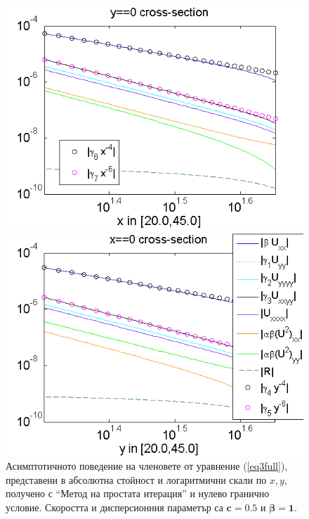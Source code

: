 \documentclass[a4paper]{article}
\newcommand{\rf}[1]{(\ref{#1})}
\theoremstyle{remark}
\begin{document}
\begin{figure}[ht]
	\begin{minipage}[b]{0.95\linewidth}
		\raggedleft
		\includegraphics[width=\linewidth]{AssymptForEachTerm/bt1_c010_090/ChristovIC_AlongX_50_ZB2_bt1_c050_h020_O(h^6).png}
	\end{minipage}
	\begin{minipage}[b]{0.95\linewidth}
		 \raggedright
		\includegraphics[width=\linewidth]{AssymptForEachTerm/bt1_c010_090/ChristovIC_AlongY_50_ZB2_bt1_c050_h020_O(h^6).png}
	\end{minipage}
	\caption{Асимптотичното поведение на членовете от уравнение \rf{eq3full}, представени в абсолютна стойност и логаритмични скали по $x,y$, получено с ``Метод на простата итерация'' и нулево гранично условие. Скоростта и дисперсионния параметър са $\boldsymbol{c=0.5}$ и $\boldsymbol{\beta = 1}$. }
	\label{fig:assympt_beta1c05}
\end{figure}
\FloatBarrier
\end{document}
